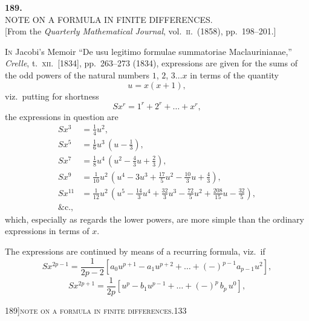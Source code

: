 \documentclass[11pt]{article}
\begin{document}
\bigskip

\begin{center}
{\Large\bfseries 189.}\\[8pt]
{\large NOTE ON A FORMULA IN FINITE DIFFERENCES.}\\[6pt]
\small [From the \emph{Quarterly Mathematical Journal}, vol.~\textsc{ii}.\ (1858), pp.~198--201.]
\end{center}

\bigskip

\noindent \textsc{In} Jacobi's Memoir ``De usu legitimo formulae summatoriae Maclaurinianae,'' \emph{Crelle}, t.~\textsc{xii}.\ [1834], pp.~263--273 (1834), expressions are given for the sums of the odd powers of the natural numbers $1$, $2$, $3 \ldots x$ in terms of the quantity
\[
u = x(x+1),
\]
viz.\ putting for shortness
\[
Sx^{r} = 1^{r} + 2^{r} + \ldots + x^{r},
\]
the expressions in question are
\begin{align*}
Sx^{3} &= \tfrac{1}{4} u^{2}, \\
Sx^{5} &= \tfrac{1}{6} u^{3}\,(u - \tfrac{1}{3}), \\
Sx^{7} &= \tfrac{1}{8} u^{4}\,(u^{2} - \tfrac{4}{3} u + \tfrac{2}{3}), \\
Sx^{9} &= \tfrac{1}{10} u^{2}\,(u^{4} - 3 u^{3} + \tfrac{17}{5} u^{2} - \tfrac{10}{3} u + \tfrac{4}{3}), \\
Sx^{11} &= \tfrac{1}{12} u^{2}\,(u^{5} - \tfrac{14}{3} u^{4} + \tfrac{32}{3} u^{3} - \tfrac{72}{5} u^{2} + \tfrac{208}{15} u - \tfrac{32}{5}), \\
\&\text{c.,}
\end{align*}
which, especially as regards the lower powers, are more simple than the ordinary expressions in terms of $x$.

The expressions are continued by means of a recurring formula, viz.\ if
\[
Sx^{2p-1} = \frac{1}{2p - 2}\left[a_{0} u^{p+1} - a_{1} u^{p+2} + \ldots + (-)^{p-1} a_{p-1} u^{2}\right],
\]
\[
Sx^{2p+1} = \frac{1}{2p}\left[u^{p} - b_{1} u^{p-1} + \ldots + (-)^{p}\, b_{p}\, u^{0}\right],
\]

\newpage

\begin{center}
\small 189]\hfill\textsc{note on a formula in finite differences.}\hfill\textsc{133}
\end{center}

\medskip
\end{document}
